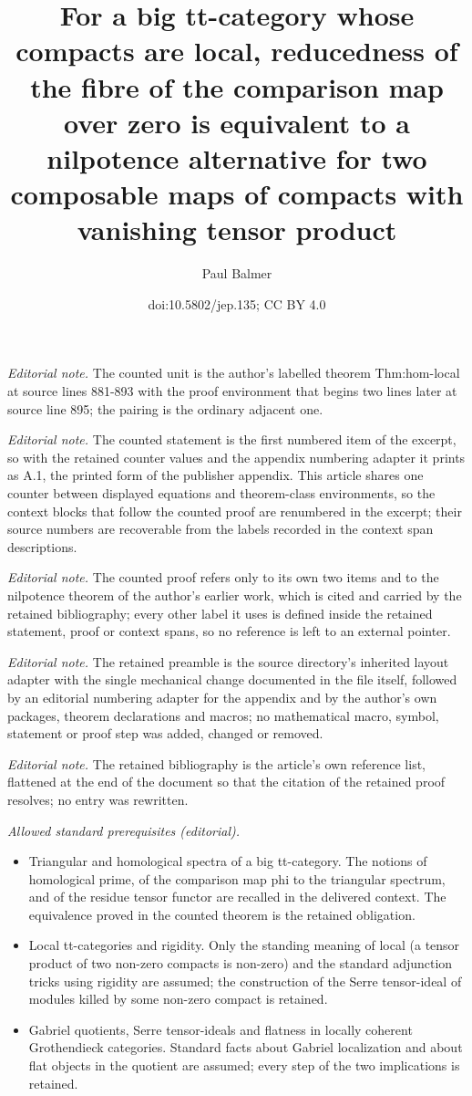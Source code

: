 \documentclass[10pt,a4paper]{article}
\title{For a big tt-category whose compacts are local, reducedness of the fibre of the comparison map over zero is equivalent to a nilpotence alternative for two composable maps of compacts with vanishing tensor product}
\author{Paul Balmer}
\date{doi:10.5802/jep.135; CC BY 4.0}
\numberwithin{equation}{section}
\theoremstyle{definition}
\begin{document}
\maketitle
\setcounter{section}{1}
\setcounter{equation}{0}
\noindent\textit{Editorial note.} The counted unit is the author's labelled theorem Thm:hom-local at source lines 881-893 with the proof environment that begins two lines later at source line 895; the pairing is the ordinary adjacent one.\par\medskip
\noindent\textit{Editorial note.} The counted statement is the first numbered item of the excerpt, so with the retained counter values and the appendix numbering adapter it prints as A.1, the printed form of the publisher appendix. This article shares one counter between displayed equations and theorem-class environments, so the context blocks that follow the counted proof are renumbered in the excerpt; their source numbers are recoverable from the labels recorded in the context span descriptions.\par\medskip
\noindent\textit{Editorial note.} The counted proof refers only to its own two items and to the nilpotence theorem of the author's earlier work, which is cited and carried by the retained bibliography; every other label it uses is defined inside the retained statement, proof or context spans, so no reference is left to an external pointer.\par\medskip
\noindent\textit{Editorial note.} The retained preamble is the source directory's inherited layout adapter with the single mechanical change documented in the file itself, followed by an editorial numbering adapter for the appendix and by the author's own packages, theorem declarations and macros; no mathematical macro, symbol, statement or proof step was added, changed or removed.\par\medskip
\noindent\textit{Editorial note.} The retained bibliography is the article's own reference list, flattened at the end of the document so that the citation of the retained proof resolves; no entry was rewritten.\par\medskip
\noindent\textit{Allowed standard prerequisites (editorial).}\begin{itemize}
\item Triangular and homological spectra of a big tt-category. The notions of homological prime, of the comparison map phi to the triangular spectrum, and of the residue tensor functor are recalled in the delivered context. The equivalence proved in the counted theorem is the retained obligation.
\item Local tt-categories and rigidity. Only the standing meaning of local (a tensor product of two non-zero compacts is non-zero) and the standard adjunction tricks using rigidity are assumed; the construction of the Serre tensor-ideal of modules killed by some non-zero compact is retained.
\item Gabriel quotients, Serre tensor-ideals and flatness in locally coherent Grothendieck categories. Standard facts about Gabriel localization and about flat objects in the quotient are assumed; every step of the two implications is retained.
\end{itemize}\medskip
\end{document}

